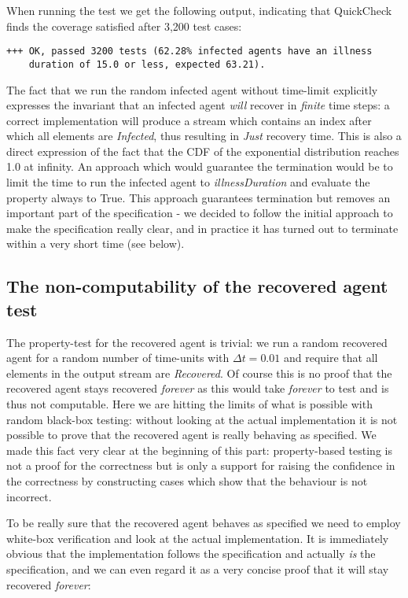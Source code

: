 When running the test we get the following output, indicating that QuickCheck finds the coverage satisfied after 3,200 test cases:

\begin{verbatim}
+++ OK, passed 3200 tests (62.28% infected agents have an illness 
    duration of 15.0 or less, expected 63.21).
\end{verbatim}

The fact that we run the random infected agent without time-limit explicitly expresses the invariant that an infected agent \textit{will} recover in \textit{finite} time steps: a correct implementation will produce a stream which contains an index after which all elements are \textit{Infected}, thus resulting in \textit{Just} recovery time. This is also a direct expression of the fact that the CDF of the exponential distribution reaches 1.0 at infinity. An approach which would guarantee the termination would be to limit the time to run the infected agent to \textit{illnessDuration} and evaluate the property always to True. This approach guarantees termination but removes an important part of the specification - we decided to follow the initial approach to make the specification really clear, and in practice it has turned out to terminate within a very short time (see below).

\subsection{The non-computability of the recovered agent test}
The property-test for the recovered agent is trivial: we run a random recovered agent for a random number of time-units with $\Delta t = 0.01$ and require that all elements in the output stream are \textit{Recovered}. Of course this is no proof that the recovered agent stays recovered \textit{forever} as this would take \textit{forever} to test and is thus not computable.  Here we are hitting the limits of what is possible with random black-box testing: without looking at the actual implementation it is not possible to prove that the recovered agent is really behaving as specified. We made this fact very clear at the beginning of this part: property-based testing is not a proof for the correctness but is only a support for raising the confidence in the correctness by constructing cases which show that the behaviour is not incorrect.

To be really sure that the recovered agent behaves as specified we need to employ white-box verification and look at the actual implementation. It is immediately obvious that the implementation follows the specification and actually \textit{is} the specification, and we can even regard it as a very concise proof that it will stay recovered \textit{forever}:

